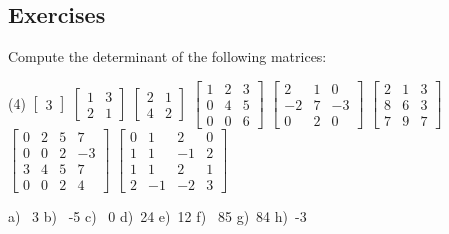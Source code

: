 \subsection{Exercises}

\begin{exercise}
Compute the determinant of the following matrices:
\begin{tasks}(4)
\task
$\begin{bmatrix}
3
\end{bmatrix}$
\task
$\begin{bmatrix}
1 & 3 \\
2 & 1
\end{bmatrix}$
\task
$\begin{bmatrix}
2 & 1 \\
4 & 2
\end{bmatrix}$
\task
$\begin{bmatrix}
1 & 2 & 3 \\
0 & 4 & 5 \\
0 & 0 & 6
\end{bmatrix}$
\task
$\begin{bmatrix}
2 & 1 & 0 \\
-2 & 7 & -3 \\
0 & 2 & 0
\end{bmatrix}$
\task
$\begin{bmatrix}
2 & 1 & 3 \\
8 & 6 & 3 \\
7 & 9 & 7
\end{bmatrix}$
\task
$\begin{bmatrix}
0 & 2 & 5 & 7 \\
0 & 0 & 2 & -3 \\
3 & 4 & 5 & 7 \\
0 & 0 & 2 & 4
\end{bmatrix}$
\task
$\begin{bmatrix}
0 &  1 &  2 &  0 \\
1 &  1 & -1 & 2 \\
1 &  1 &  2 & 1 \\
2 & -1 & -2 & 3
\end{bmatrix}$
\end{tasks}
\end{exercise}
\comboSol{%
}
{%
a)~ 3 \quad b)~ -5 \quad c)~ 0 \quad d)~24 \quad e)~12 \quad f)~ 85 \quad g)~84 \quad h)~-3
}

